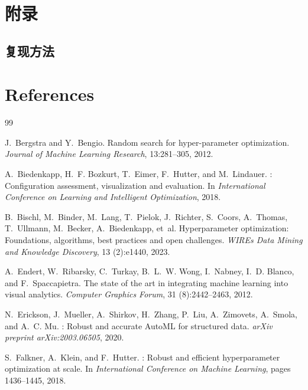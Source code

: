 \documentclass[11pt,a4paper]{ctexart}
\begin{document}
\section{附录}

\subsection{复现方法}

\section{References}

\begin{thebibliography}{99}

J.~Bergstra and Y.~Bengio.
\newblock Random search for hyper-parameter optimization.
\newblock \emph{Journal of Machine Learning Research}, 13:281--305, 2012.

A.~Biedenkapp, H.~F. Bozkurt, T.~Eimer, F.~Hutter, and M.~Lindauer.
: Configuration assessment, visualization and evaluation.
\newblock In \emph{International Conference on Learning and Intelligent Optimization}, 2018.

B.~Bischl, M.~Binder, M.~Lang, T.~Pielok, J.~Richter, S.~Coors, A.~Thomas, T.~Ullmann, M.~Becker, A.~Biedenkapp, et~al.
\newblock Hyperparameter optimization: Foundations, algorithms, best practices and open challenges.
\newblock \emph{WIREs Data Mining and Knowledge Discovery}, 13 (2):e1440, 2023.

A.~Endert, W.~Ribarsky, C.~Turkay, B.~L.~W. Wong, I.~Nabney, I.~D. Blanco, and F.~Spaccapietra.
\newblock The state of the art in integrating machine learning into visual analytics.
\newblock \emph{Computer Graphics Forum}, 31 (8):2442--2463, 2012.

N.~Erickson, J.~Mueller, A.~Shirkov, H.~Zhang, P.~Liu, A.~Zimovets, A.~Smola, and A.~C. Mu.
: Robust and accurate {AutoML} for structured data.
\newblock \emph{arXiv preprint arXiv:2003.06505}, 2020.

S.~Falkner, A.~Klein, and F.~Hutter.
: Robust and efficient hyperparameter optimization at scale.
\newblock In \emph{International Conference on Machine Learning}, pages 1436--1445, 2018.


\end{thebibliography}
\end{document}
